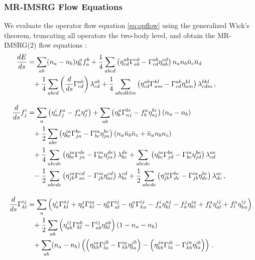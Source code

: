 \subsubsection{MR-IMSRG Flow Equations}
We evaluate the operator flow equation \eqref{eq:opflow} using the generalized
Wick's theorem, truncating all operators the two-body level, and obtain the 
MR-IMSRG(2) flow equations \cite{Hergert:2013ij,Hergert:2014vn,Hergert:2017kx}:
\begin{align}
  \totd{E}{s} &=     
    \sum_{ab}(n_{a}-n_{b})\eta^{a}_{b}f^{b}_{a}
    +\frac{1}{4}\sum_{abcd}
        \left(\eta^{ab}_{cd}\Gamma^{cd}_{ab}-\Gamma^{ab}_{cd}\eta^{cd}_{ab}\right)
        n_{a}n_{b}\bar{n}_{c}\bar{n}_{d}
    \notag\\
  &\hphantom{=}
    +\frac{1}{4}\sum_{abcd}\left(\totd{}{s}\Gamma^{ab}_{cd}\right)\lambda^{ab}_{cd}
    +\frac{1}{4}\sum_{abcdklm}\left(\eta^{ab}_{cd}\Gamma^{kl}_{am}-\Gamma^{ab}_{cd}\eta^{kl}_{am}\right)\lambda^{bkl}_{cdm}\,,
    \label{eq:mr_flow_0b_tens}
  \\[10pt]
% 
  \totd{}{s}f^{i}_{j} &=
    \sum_{a}\left(\eta^{i}_{a}f^{a}_{j}-f^{i}_{a}\eta^{a}_{j}\right)
    +\sum_{ab}\left(\eta^{a}_{b}\Gamma^{bi}_{aj}-f^{a}_{b}\eta^{bi}_{aj}\right)(n_{a}-n_{b})
  \notag\\
  &\hphantom{=}
  +\frac{1}{2}\sum_{abc}
    \left(\eta^{ia}_{bc}\Gamma^{bc}_{ja}-\Gamma^{ia}_{bc}\eta^{bc}_{ja}\right)\left(n_{a}\bar{n}_{b}\bar{n}_{c}+\bar{n}_{a}n_{b}n_{c}\right)
  \notag\\
  &\hphantom{=}
      +\frac{1}{4}\sum_{abcde}\left(\eta^{ia}_{bc}\Gamma^{de}_{ja}-\Gamma^{ia}_{bc}\eta^{de}_{ja}\right)\lambda^{de}_{bc} 
    +\sum_{abcde}\left(\eta^{ia}_{bc}\Gamma^{be}_{jd}-\Gamma^{ia}_{bc}\eta^{be}_{jd}\right)\lambda^{ae}_{cd}
  \notag\\
  &\hphantom{=}
      -\frac{1}{2}\sum_{abcde}\left(\eta^{ia}_{jb}\Gamma^{cd}_{ae}-\Gamma^{ia}_{jb}\eta^{cd}_{ae}\right)\lambda^{cd}_{be}
    +\frac{1}{2}\sum_{abcde}\left(\eta^{ia}_{jb}\Gamma^{bc}_{de}-\Gamma^{ia}_{jb}\eta^{bc}_{de}\right)\lambda^{ac}_{de}\,,
  \label{eq:mr_flow_1b_tens}\\[10pt]
%
  \totd{}{s}\Gamma^{ij}_{kl}&=  
  \sum_{a}\left(\eta^{i}_{a}\Gamma^{aj}_{kl}+\eta^{j}_{a}\Gamma^{ia}_{kl}-\eta^{a}_{k}\Gamma^{ij}_{al}-\eta^{a}_{l}\Gamma^{ij}_{ka}
  -f^{i}_{a}\eta^{aj}_{kl}-f^{j}_{a}\eta^{ia}_{kl}+f^{a}_{k}\eta^{ij}_{al}+f^{a}_{l}\eta^{ij}_{ka}\right)
  \notag\\
  &\hphantom{=}
    +\frac{1}{2}\sum_{ab}\left(\eta^{ij}_{ab}\Gamma^{ab}_{kl}-\Gamma^{ij}_{ab}\eta^{ab}_{kl}\right)
     \left(1-n_{a}-n_{b}\right)
  \notag\\
  &\hphantom{=}
    +\sum_{ab}(n_{a}-n_{b})\left(\left(\eta^{ia}_{kb}\Gamma^{jb}_{la}-\Gamma^{ia}_{kb}\eta^{jb}_{la}\right)-\left(\eta^{ja}_{kb}\Gamma^{ib}_{la}-\Gamma^{ja}_{kb}\eta^{ib}_{la}\right)\right)\,.
  \label{eq:mr_flow_2b_tens}
\end{align}

